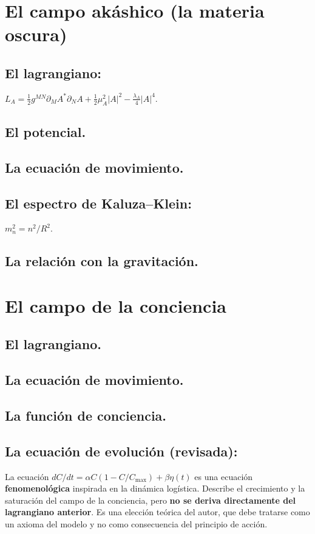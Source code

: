 \documentclass[11pt,a4paper]{article}
\begin{document}
\section{El campo akáshico (la materia oscura)}
\subsection{El lagrangiano:} $L_A = \frac{1}{2} g^{MN} \partial_M A^* \partial_N A + \frac{1}{2} \mu_A^2 |A|^2 - \frac{\lambda_A}{4} |A|^4$.
\subsection{El potencial.}
\subsection{La ecuación de movimiento.}
\subsection{El espectro de Kaluza--Klein:} $m_n^2 = n^2/R^2$.
\subsection{La relación con la gravitación.}

\section{El campo de la conciencia}
\subsection{El lagrangiano.}
\subsection{La ecuación de movimiento.}
\subsection{La función de conciencia.}
\subsection{La ecuación de evolución (revisada):} La ecuación $dC/dt = \alpha C (1 - C/C_{\text{max}}) + \beta \eta(t)$ es una ecuación \textbf{fenomenológica} inspirada en la dinámica logística. Describe el crecimiento y la saturación del campo de la conciencia, pero \textbf{no se deriva directamente del lagrangiano anterior}. Es una elección teórica del autor, que debe tratarse como un axioma del modelo y no como consecuencia del principio de acción.
\end{document}
